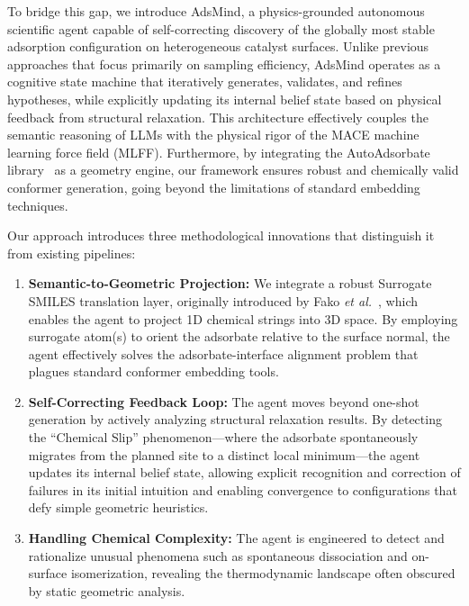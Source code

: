 \documentclass{article}
\begin{document}
To bridge this gap, we introduce AdsMind, a physics-grounded autonomous scientific agent capable of self-correcting discovery of the globally most stable adsorption configuration on heterogeneous catalyst surfaces. Unlike previous approaches that focus primarily on sampling efficiency, AdsMind operates as a cognitive state machine that iteratively generates, validates, and refines hypotheses, while explicitly updating its internal belief state based on physical feedback from structural relaxation. This architecture effectively couples the semantic reasoning of LLMs with the physical rigor of the MACE machine learning force field (MLFF). Furthermore, by integrating the AutoAdsorbate library~\cite{fako2025simple} as a geometry engine, our framework ensures robust and chemically valid conformer generation, going beyond the limitations of standard embedding techniques.

Our approach introduces three methodological innovations that distinguish it from existing pipelines:

\begin{enumerate}
    \item \textbf{Semantic-to-Geometric Projection:} We integrate a robust Surrogate SMILES translation layer, originally introduced by Fako \textit{et al.}~\cite{fako2025simple}, which enables the agent to project 1D chemical strings into 3D space. By employing surrogate atom(s) to orient the adsorbate relative to the surface normal, the agent effectively solves the adsorbate-interface alignment problem that plagues standard conformer embedding tools.
    \item \textbf{Self-Correcting Feedback Loop:} The agent moves beyond one-shot generation by actively analyzing structural relaxation results. By detecting the ``Chemical Slip'' phenomenon—where the adsorbate spontaneously migrates from the planned site to a distinct local minimum—the agent updates its internal belief state, allowing explicit recognition and correction of failures in its initial intuition and enabling convergence to configurations that defy simple geometric heuristics.
    \item \textbf{Handling Chemical Complexity:} The agent is engineered to detect and rationalize unusual phenomena such as spontaneous dissociation and on-surface isomerization, revealing the thermodynamic landscape often obscured by static geometric analysis.
\end{enumerate}
\end{document}
